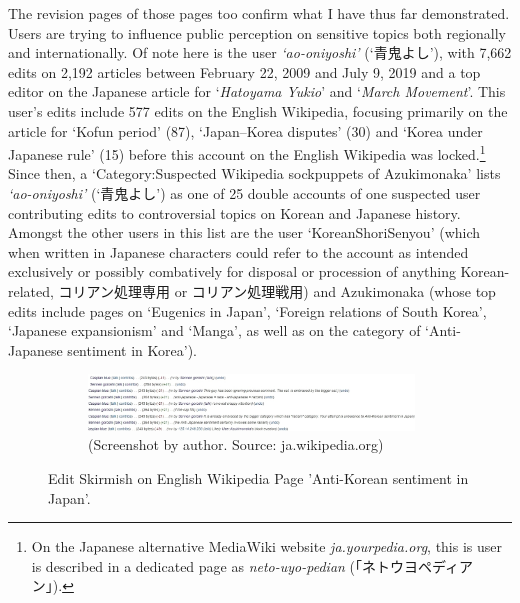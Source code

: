 \documentclass[10pt,british,A4paper,,openany]{memoir}
\begin{document}
The revision pages of those pages too confirm what I have thus far
demonstrated. Users are trying to influence public perception on
sensitive topics both regionally and internationally. Of note here is
the user \emph{`ao-oniyoshi'} (`青鬼よし'), with 7,662 edits on 2,192
articles between February 22, 2009 and July 9, 2019 and a top editor on
the Japanese article for `\emph{Hatoyama Yukio}' and `\emph{March
 Movement}'. This user's edits include 577 edits on the English
Wikipedia, focusing primarily on the article for `Kofun period' (87),
`Japan--Korea disputes' (30) and `Korea under Japanese rule' (15) before
this account on the English Wikipedia was locked.\footnote{On the
  Japanese alternative MediaWiki website \emph{ja.yourpedia.org}, this
  is user is described in a dedicated page as \emph{neto-uyo-pedian}
  (「ネトウヨペディアン」).} Since then, a `Category:Suspected Wikipedia
sockpuppets of Azukimonaka' lists \emph{`ao-oniyoshi'} (`青鬼よし') as
one of 25 double accounts of one suspected user contributing edits to
controversial topics on Korean and Japanese history. Amongst the other
users in this list are the user `KoreanShoriSenyou' (which when written
in Japanese characters could refer to the account as intended
exclusively or possibly combatively for disposal or procession of
anything Korean-related, コリアン処理専用 or コリアン処理戦用) and
Azukimonaka (whose top edits include pages on `Eugenics in Japan',
`Foreign relations of South Korea', `Japanese expansionism' and `Manga',
as well as on the category of `Anti-Japanese sentiment in Korea').

\begin{figure}[!htb]
 \centering
 \begin{subfigure}[b]{1\textwidth}
 \includegraphics[width=0.95\textwidth,trim=4 4 4 4,clip]{images/wiki/sennen-caspian2.jpg}
  \caption*{(Screenshot by author. Source: ja.wikipedia.org)}
 \end{subfigure}
 \caption{\label{fig:caspian} Edit Skirmish on English Wikipedia Page 'Anti-Korean sentiment in Japan'.}
\end{figure}
\end{document}
